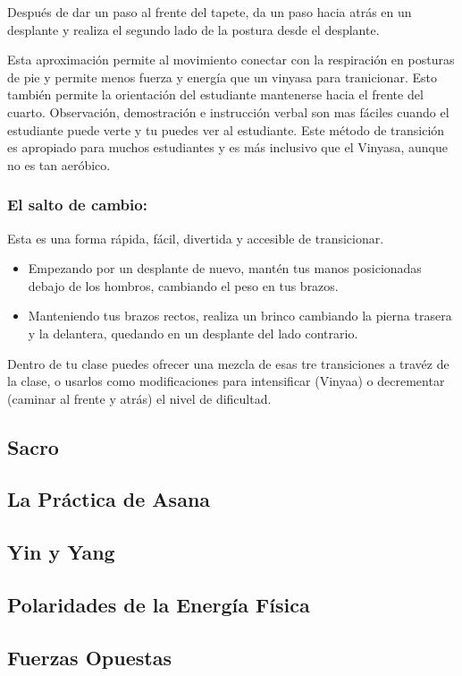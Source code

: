 Después de dar un paso al frente del tapete, da un paso hacia atrás en un desplante y realiza el segundo lado de la postura desde el desplante.

Esta aproximación permite al movimiento conectar con la respiración en posturas de pie y permite menos fuerza y energía que un vinyasa para tranicionar. Esto también permite la orientación del estudiante mantenerse hacia el frente del cuarto. Observación, demostración e instrucción verbal son mas fáciles cuando el estudiante puede verte y tu puedes ver al estudiante. Este método de transición es apropiado para muchos estudiantes y es más inclusivo que el Vinyasa, aunque no es tan aeróbico.

\subsubsection{El salto de cambio:}
Esta es una forma rápida, fácil, divertida y accesible de transicionar.
\begin{itemize}
	\item Empezando por un desplante de nuevo, mantén tus manos posicionadas debajo de los hombros, cambiando el peso en tus brazos.
	\item Manteniendo tus brazos rectos, realiza un brinco cambiando la pierna trasera y la delantera, quedando en un desplante del lado contrario.
\end{itemize}

Dentro de tu clase puedes ofrecer una mezcla de esas tre transiciones a travéz de la clase, o usarlos como modificaciones para intensificar (Vinyaa) o decrementar (caminar al frente y atrás) el nivel de dificultad.


\subsection{Sacro}
\subsection{La Práctica de Asana}
\subsection{Yin y Yang}
\subsection{Polaridades de la Energía Física}
\subsection{Fuerzas Opuestas}
